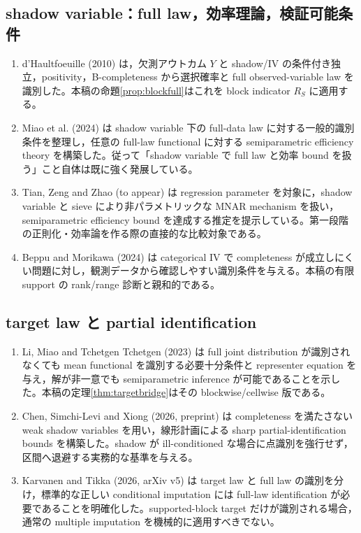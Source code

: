 \documentclass[11pt,a4paper]{ltjsarticle}
\theoremstyle{remark}\newtheorem{remark}{注意}[section]
\begin{document}
\subsection{shadow variable：full law，効率理論，検証可能条件}
\begin{enumerate}
\item d'Haultfoeuille (2010) は，欠測アウトカム $Y$ と shadow/IV の条件付き独立，positivity，B-completeness から選択確率と full observed-variable law を識別した。本稿の命題\ref{prop:blockfull}はこれを block indicator $R_S$ に適用する。
\item Miao et al. (2024) は shadow variable 下の full-data law に対する一般的識別条件を整理し，任意の full-law functional に対する semiparametric efficiency theory を構築した。従って「shadow variable で full law と効率 bound を扱う」こと自体は既に強く発展している。
\item Tian, Zeng and Zhao (to appear) は regression parameter を対象に，shadow variable と sieve により非パラメトリックな MNAR mechanism を扱い，semiparametric efficiency bound を達成する推定を提示している。第一段階の正則化・効率論を作る際の直接的な比較対象である。
\item Beppu and Morikawa (2024) は categorical IV で completeness が成立しにくい問題に対し，観測データから確認しやすい識別条件を与える。本稿の有限 support の rank/range 診断と親和的である。
\end{enumerate}

\subsection{target law と partial identification}
\begin{enumerate}
\item Li, Miao and Tchetgen Tchetgen (2023) は full joint distribution が識別されなくても mean functional を識別する必要十分条件と representer equation を与え，解が非一意でも semiparametric inference が可能であることを示した。本稿の定理\ref{thm:targetbridge}はその blockwise/cellwise 版である。
\item Chen, Simchi-Levi and Xiong (2026, preprint) は completeness を満たさない weak shadow variables を用い，線形計画による sharp partial-identification bounds を構築した。shadow が ill-conditioned な場合に点識別を強行せず，区間へ退避する実務的な基準を与える。
\item Karvanen and Tikka (2026, arXiv v5) は target law と full law の識別を分け，標準的な正しい conditional imputation には full-law identification が必要であることを明確化した。supported-block target だけが識別される場合，通常の multiple imputation を機械的に適用すべきでない。
\end{enumerate}
\end{document}
